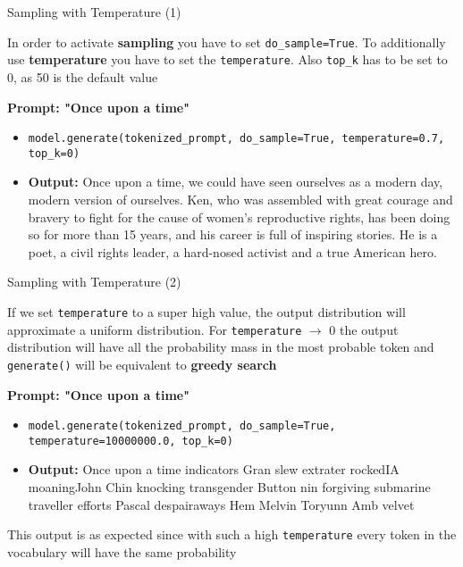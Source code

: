 \begin{vbframe}{Sampling with Temperature (1)}

\vfill

In order to activate \textbf{sampling} you have to set \texttt{do\_sample=True}. To additionally use \textbf{temperature} you have to set the \texttt{temperature}. Also \texttt{top\_k} has to be set to 0, as 50 is the default value

\hspace{}

\textbf{Prompt: "Once upon a time"}

\begin{itemize}
    \item \texttt{model.generate(tokenized\_prompt, do\_sample=True, temperature=0.7, top\_k=0)}
    \item \textbf{Output:} Once upon a time, we could have seen ourselves as a modern day, modern version of ourselves. Ken, who was assembled with great courage and bravery to fight for the cause of women's reproductive rights, has been doing so for more than 15 years, and his career is full of inspiring stories. He is a poet, a civil rights leader, a hard-nosed activist and a true American hero.
\end{itemize}

\vfill

\end{vbframe}


\begin{vbframe}{Sampling with Temperature (2)}

\vfill

If we set \texttt{temperature} to a super high value, the output distribution will approximate a uniform distribution. For \texttt{temperature} $\rightarrow$ 0 the output distribution will have all the probability mass in the most probable token and \texttt{generate()} will be equivalent to \textbf{greedy search}

\hspace{}

\textbf{Prompt: "Once upon a time"}

\begin{itemize}
    \item \texttt{model.generate(tokenized\_prompt, do\_sample=True, temperature=10000000.0, top\_k=0)}
    \item \textbf{Output:} Once upon a time indicators Gran slew extrater rockedIA moaningJohn Chin knocking transgender Button nin forgiving submarine traveller efforts Pascal despairaways Hem Melvin Toryunn Amb velvet
\end{itemize}

\vfill

This output is as expected since with such a high \texttt{temperature} every token in the vocabulary will have the same probability

\end{vbframe}

